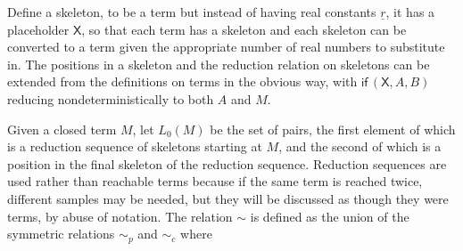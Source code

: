 \documentclass{article}
\newcommand{\tif}[3]{\textsf{if}\,(#1, #2, #3)} %
\newcommand{\skeletonPlaceholder}{\textsf{X}} %
\theoremstyle{definition}
\theoremstyle{lemma}
\theoremstyle{remark}
\begin{document}
Define a skeleton, to be a term but instead of having real constants $\underline r$, it has a placeholder $\skeletonPlaceholder$, so that each term has a skeleton and each skeleton can be converted to a term given the appropriate number of real numbers to substitute in. The positions in a skeleton and the reduction relation on skeletons can be extended from the definitions on terms in the obvious way, with $\tif{\skeletonPlaceholder}{A}{B}$ reducing nondeterministically to both $A$ and $M$.

Given a closed term $M$, let $L_0(M)$ be the set of pairs, the first element of which is a reduction sequence of skeletons starting at $M$, and the second of which is a position in the final skeleton of the reduction sequence.  Reduction sequences are used rather than reachable terms because if the same term is reached twice, different samples may be needed, but they will be discussed as though they were terms, by abuse of notation.  The relation $\sim$ is defined as the union of the symmetric relations $\sim_p$  and $\sim_c$  where
\end{document}
